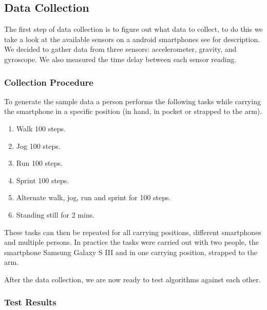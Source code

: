 \subsection{Data Collection}
The first step of data collection is to figure out what data to collect, to do this we take a look at the available sensors on a android smartphones see  for description. We decided to gather data from three sensors: accelerometer, gravity, and gyroscope. We also measured the time delay between each sensor reading.

\subsubsection{Collection Procedure}
To generate the sample data a person performs the following tasks while carrying the smartphone in a specific position (in hand, in pocket or strapped to the arm).
\begin{enumerate}
\item Walk 100 steps.
\item Jog 100 steps.
\item Run 100 steps.
\item Sprint 100 steps.
\item Alternate walk, jog, run and sprint for 100 steps.
\item Standing still for 2 mins.
\end{enumerate}

These tasks can then be repeated for all carrying positions, different smartphones and multiple persons. In practice the tasks were carried out with two people, the smartphone Samsung Galaxy S III and in one carrying position, strapped to the arm.

After the data collection, we are now ready to test algorithms against each other.


\subsubsection{Test Results}


